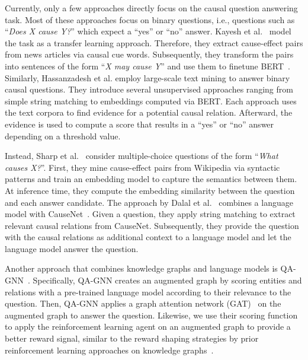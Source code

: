 Currently, only a few approaches directly focus on the causal question answering task. Most of these approaches focus on binary questions, i.e., questions such as ``\textit{Does X cause Y?}'' which expect a ``yes'' or ``no'' answer. 
Kayesh et al.~\cite{KayeshCausalTransfer2020} model the task as a transfer learning approach. Therefore, they extract cause-effect pairs from news articles via causal cue words. Subsequently, they transform the pairs into sentences of the form ``\textit{X may cause Y}'' and use them to finetune BERT~\cite{DevlinBert2019}. Similarly, Hassanzadesh et al. \cite{HassanzadeshCausalQA2019} employ large-scale text mining to answer binary causal questions. They introduce several unsupervised approaches ranging from simple string matching to embeddings computed via BERT. Each approach uses the text corpora to find evidence for a potential causal relation. Afterward, the evidence is used to compute a score that results in a ``yes'' or ``no'' answer depending on a threshold value.


Instead, Sharp et al.~\cite{SharpCausalQAEmbeddings2016} consider multiple-choice questions of the form ``\textit{What causes X?}''. First, they mine cause-effect pairs from Wikipedia via syntactic patterns and train an embedding model to capture the semantics between them. At inference time, they compute the embedding similarity between the question and each answer candidate. The approach by Dalal et al.~\cite{DalalCausalQAEnhancing2021, DalalCausalQAISWC2021}
combines a language model with CauseNet~\cite{Heindorf2020Causenet}.
Given a question, they apply string matching to extract relevant causal relations from CauseNet. Subsequently, they provide the question with the causal relations  as additional context to a language model and let the language model answer the question. 

Another approach that combines knowledge graphs and language models is QA-GNN~\cite{Yasunaga2021QAGNN}.
Specifically, QA-GNN creates an augmented graph by scoring entities and relations with a pre-trained language model according to their relevance to the question. Then, QA-GNN applies a graph attention network (GAT)~\cite{Velickovic2018GAT} on the augmented graph to answer the question. Likewise, we use their scoring function to apply the reinforcement learning agent on an augmented graph to provide a better reward signal, similar to the reward shaping strategies by prior reinforcement learning approaches on knowledge graphs~\cite{Lin2020RewardShaping, Qiu2020Stepwise}.


